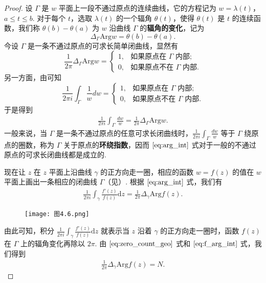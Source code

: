 \documentclass[../../main.tex]{subfiles}
\begin{document}
\begin{proof}
 设 \( \Gamma \) 是 \( w \) 平面上一段不通过原点的连续曲线，它的方程记为 \( w = \lambda(t) \)，\( a \leqslant  t \leqslant  b \). 对于每个 \( t \)，选取 \( \lambda(t) \) 的一个辐角 \( \theta(t) \)，使得 \( \theta(t) \) 是 \( t \) 的连续函数，我们称 \( \theta(b) - \theta(a) \) 为 \( w \) 沿曲线 \( \Gamma \) 的\textbf{辐角的变化}，记为
\[
\Delta_{\Gamma} \text{Arg} w = \theta(b) - \theta(a).
\]
今设 \( \Gamma \) 是一条不通过原点的可求长简单闭曲线，显然有
\[
\frac{1}{2\pi} \Delta_{\Gamma} \text{Arg} w = 
\begin{cases} 
1, & \text{如果原点在 } \Gamma \text{ 内部}; \\
0, & \text{如果原点不在 } \Gamma \text{ 内部}.
\end{cases}
\]
另一方面，由可知
\[
\frac{1}{2\pi i} \int_{\Gamma} \frac{1}{w} dw = 
\begin{cases} 
1, & \text{如果原点在 } \Gamma \text{ 内部}; \\
0, & \text{如果原点不在 } \Gamma \text{ 内部}.
\end{cases}
\]
于是得到
\begin{align}
\frac{1}{2\pi i} \int_{\Gamma} \frac{dw}{w} = \frac{1}{2\pi} \Delta_{\Gamma} \text{Arg} w. \label{eq:arg_int}
\end{align}
一般来说，当 \( \Gamma \) 是一条不通过原点的任意可求长闭曲线时，\( \frac{1}{2\pi i} \int_{\Gamma} \frac{dw}{w} \) 等于 \( \Gamma \) 绕原点的圈数，称为 \( \Gamma \) 关于原点的\textbf{环绕指数}，因而 \(\eqref{eq:arg_int}\) 式对于一般的不通过原点的可求长闭曲线都是成立的.

现在让 \( z \) 在 \( z \) 平面上沿曲线 \( \gamma \) 的正方向走一圈，相应的函数 \( w = f(z) \) 的值在 \( w \) 平面上画出一条相应的闭曲线 \( \Gamma \)（见）. 根据 \(\eqref{eq:arg_int}\) 式，我们有
\begin{align}
\frac{1}{2\pi i} \int_{\gamma} \frac{f'(z)}{f(z)} \mathrm{d}z = \frac{1}{2\pi} \Delta_{\gamma} \text{Arg} f(z). \label{eq:f_arg_int}
\end{align}
\begin{figure}[H]
\centering
\texttt{[image: 图4.6.png]}
\caption{}
\label{figure:图4.6}
\end{figure}
由此可知，积分 \( \frac{1}{2\pi i} \int_{\gamma} \frac{f'(z)}{f(z)} \mathrm{d}z \) 就表示当 \( z \) 沿着 \( \gamma \) 的正方向走一圈时，函数 \( f(z) \) 在 \( \Gamma \) 上的辐角变化再除以 \( 2\pi \). 由 \(\eqref{eq:zero_count_geo}\) 式和 \(\eqref{eq:f_arg_int}\) 式，我们得到
\begin{align}
\frac{1}{2\pi} \Delta_{\gamma} \text{Arg} f(z) = N. \label{eq:arg_zero}
\end{align}
\end{proof}
\end{document}
